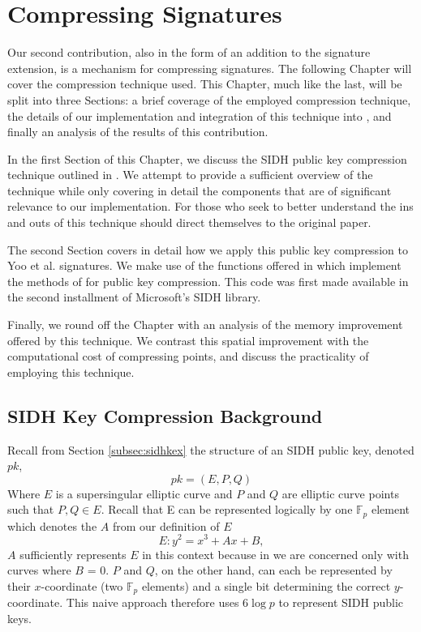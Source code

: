 \chapter{Compressing Signatures}
\label{sec:compress}

Our second contribution, also in the form of an addition to the \sidh signature extension, is a mechanism for compressing signatures. The following Chapter will cover the compression technique used. This Chapter, much like the last, will be split into three Sections: a brief coverage of the employed compression technique, the details of our implementation and integration of this technique into \sidh, and finally an analysis of the results of this contribution.

In the first Section of this Chapter, we discuss the SIDH public key compression technique outlined in \cite{compwr}. We attempt to provide a sufficient overview of the technique while only covering in detail the components that are of significant relevance to our implementation. For those who seek to better understand the ins and outs of this technique should direct themselves to the original paper.  

The second Section covers in detail how we apply this public key compression to Yoo et al. signatures. We make use of the functions offered in \cite{pkcomp} which implement the methods of \cite{compwr} for public key compression. This code was first made available in the second installment of Microsoft's SIDH library.

Finally, we round off the Chapter with an analysis of the memory improvement offered by this technique. We contrast this spatial improvement with the computational cost of compressing points, and discuss the practicality of employing this technique. 

\section{SIDH Key Compression Background}

Recall from Section \ref{subsec:sidhkex} the structure of an SIDH public key, denoted $pk$,
$$
pk = (E, P, Q)
$$
Where $E$ is a supersingular elliptic curve and $P$ and $Q$ are elliptic curve points such that $P, Q \in E$. Recall that E can be represented logically by one $\mathbb{F}_{p}$ element which denotes the $A$ from our definition of $E$
$$
E : y^2 = x^3 + Ax + B,
$$
$A$ sufficiently represents $E$ in this context because in \sidh we are concerned only with curves where $B$ = 0. $P$ and $Q$, on the other hand, can each be represented by their $x$-coordinate (two $\mathbb{F}_{p}$ elements) and a single bit determining the correct $y$-coordinate. This naive approach therefore uses $6\log p$ to represent SIDH public keys.



